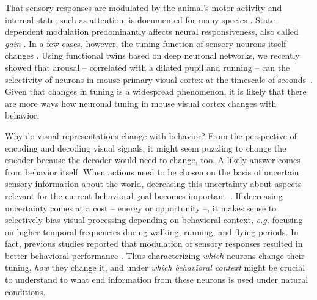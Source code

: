 \documentclass[COG,11pt]{ercgrant}
\begin{document}
That sensory responses are modulated by the animal's motor activity and internal state, such as attention, is documented for many species \parencite{Rowell1971-zj, Wiersma1968-xt, Maimon2010-sa, Niell2010-bs,Bezdudnaya2006-ge, Treue1996-lp, Musall2019-kd}.
State-dependent modulation predominantly affects neural responsiveness, also called \textit{gain} \parencite{Eggermann2014-xp, Niell2010-bs, McAdams1999-cs,Schroder2020-jl, Dadarlat2017-jw, Mineault2016-fk}. 
In a few cases, however, the tuning function of sensory neurons itself changes \parencite{Chiappe2010-bm, Bezdudnaya2006-ge, Andermann2011-vw, Treue1996-lp}. 
Using functional twins based on deep neuronal networks, we recently showed that arousal -- correlated with a dilated pupil and running -- can the selectivity of neurons in mouse primary visual cortex at the timescale of seconds~\parencite{Franke2022-do}. 
Given that changes in tuning is a widespread phenomenon, it is likely that there are more ways how neuronal tuning in mouse visual cortex changes with behavior. 

Why do visual representations change with behavior? 
From the perspective of encoding and decoding visual signals, it might seem puzzling to change the encoder because the decoder would need to change, too. 
A likely answer comes from behavior itself:
When actions need to be chosen on the basis of uncertain sensory information about the world, decreasing this uncertainty about aspects relevant for the current behavioral goal becomes important~\parencite{Chebolu2022-tb}. 
If decreasing uncertainty comes at a cost -- energy or opportunity --, it makes sense to selectively bias visual processing depending on behavioral context, \textit{e.g.} focusing on  higher temporal frequencies during walking, running, and flying periods.
In fact, previous studies reported that modulation of sensory responses resulted in better behavioral performance \parencite{Spitzer1988-kq, Bennett2013-rk, Dadarlat2017-jw, De_Gee2022-ir}.
Thus characterizing \textit{which} neurons change their tuning, \textit{how} they change it, and under \textit{which behavioral context} might be crucial to understand to what end information from these neurons is used under natural conditions.
\end{document}
